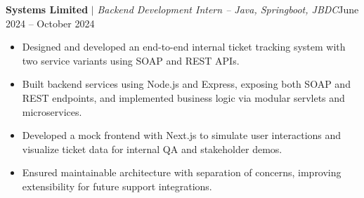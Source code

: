               \resumeProjectHeading
              {\textbf{Systems Limited}\vspace{8pt} $|$ \footnotesize\emph{Backend Development Intern – Java, Springboot, JBDC}}{June 2024 -- October 2024}
              \begin{itemize}
                \item Designed and developed an end-to-end internal ticket tracking system with two service variants using SOAP and REST APIs.
                \item Built backend services using Node.js and Express, exposing both SOAP and REST endpoints, and implemented business logic via modular servlets and microservices.
                \item Developed a mock frontend with Next.js to simulate user interactions and visualize ticket data for internal QA and stakeholder demos.
                \item Ensured maintainable architecture with separation of concerns, improving extensibility for future support integrations.
              \end{itemize}



    \resumeSubHeadingListEnd